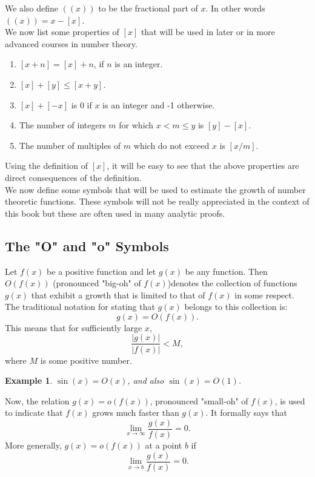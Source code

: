 \documentclass[12pt,letterpaper]{book}
\newtheorem{example}{Example}
\begin{document}
We also define $((x))$ to be the fractional part of $x$.  In other
words\\ $((x))=x-[x]$. \\
We now list some properties of $[x]$ that will be used in later or
in more advanced courses in number theory.
\begin{enumerate}
\item{$[x+n]=[x]+n$, if $n$ is an integer.} \item{$[x]+[y]\leq
[x+y]$.} \item{$[x]+[-x]$ is 0 if $x$ is an integer and -1
otherwise.} \item{The number of integers $m$ for which $x<m\leq y$
is $[y]-[x]$.} \item{The number of multiples of $m$ which do not
exceed $x$ is $[x/m]$.}
\end{enumerate}

Using the definition of $[x]$, it will be easy to see that the
above properties are direct consequences of the definition.\\
We now define some symbols that will be used to estimate the growth
of number theoretic functions.  These symbols will not be really
appreciated in the context of this book but these are often used in
many analytic proofs.

\subsection{The "O" and "o" Symbols}

\par Let $f(x)$ be a positive function and let $g(x)$ be any function.  Then $O(f(x))$
(pronounced "big-oh" of $f(x)$)denotes the collection of functions $g(x)$ that exhibit a growth that
is limited to that of $f(x)$ in some respect. The traditional notation
for stating that $g(x)$ belongs to this collection is:
\begin{equation*}
g(x)=O(f(x)).
\end{equation*}
This means that for sufficiently large $x$,
\begin{equation}
\frac{|g(x)|}{|f(x)|}<M,
\end{equation}
where $M$ is some positive number.


\begin{example}
$\sin (x)=O(x)$, and also $\sin(x)=O(1)$.
\end{example}
 Now, the relation $g(x)=o(f(x))$, pronounced
"small-oh" of $f(x)$, is used to indicate that $f(x)$ grows much
faster than $g(x)$.  It formally says that
\begin{equation}
\lim_{x\rightarrow \infty}\frac{g(x)}{f(x)}=0.
\end{equation}
More generally, $g(x)=o(f(x))$ at a point $b$ if
\begin{equation}
\lim_{x\rightarrow b}\frac{g(x)}{f(x)}=0.
\end{equation}
\end{document}
